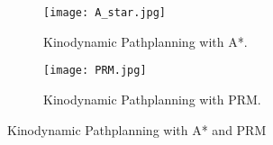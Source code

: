 \documentclass[9pt,a4paper,twoside]{rho-class/rho}
\begin{document}



        


    

    
    


        


        \begin{figure*}[t!] %
            \centering
                \begin{subfigure}[b]{0.38\linewidth} %
                    \texttt{[image: A\_star.jpg]}
                    \caption{Kinodynamic Pathplanning with A*.}
                    \label{fig:figa}
                \end{subfigure}
            \hspace{15pt}   %
                \begin{subfigure}[b]{0.38\linewidth} %
                    \centering
                    \texttt{[image: PRM.jpg]}
                    \caption{Kinodynamic Pathplanning with PRM.}
                    \label{fig:figb}
                \end{subfigure}
            \caption{Kinodynamic Pathplanning with A* and PRM}
            \label{fig:examplefloat}
        \end{figure*}
\end{document}
